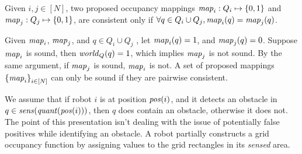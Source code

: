 \begin{definition}
    Given  $i , j \in [N]$, two proposed occupancy mappings $\mathit{map}_i: Q_i\mapsto\left\{0,1\right\}$ and $\mathit{map}_j: Q_j\mapsto \left\{0,1\right\}$, are consistent only if $\forall q \in Q_i \cup Q_j, \mathit{map}_i(q) = \mathit{map}_j(q)$.
\end{definition}

    Given $\mathit{map}_i$, $\mathit{map}_j$, and $q\in Q_i \cup Q_j$ , let $\mathit{map}_i(q) = 1$, and $\mathit{map}_j(q) = 0$. Suppose $\mathit{map}_i$ is sound, then $\mathit{world}_Q(q) = 1$, which implies $\mathit{map}_j$ is not sound. By the same argument, if $\mathit{map}_j$ is sound, $\mathit{map}_i$ is not. A set of proposed mappings $\left\{\mathit{map}_i\right\}_{i\in [N]}$ can only be sound if they are pairwise consistent.

We assume that if robot $i$ is at position $\mathit{pos}(i)$, and it detects an obstacle in $q \in \mathit{sens}(\mathit{quant}(\mathit{pos}(i)))$, then $q$ does contain an obstacle, otherwise it does not. The point of this presentation isn't dealing with the issue of potentially false positives while identifying an obstacle. A robot partially constructs a grid occupancy function by assigning values to the grid rectangles in its \emph{sensed} area.


